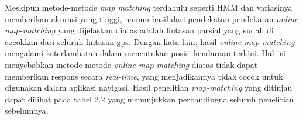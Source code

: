 Meskipun metode-metode \textit{map matching} terdahulu seperti HMM dan variasinya memberikan akurasi yang tinggi, namun hasil dari pendekatan-pendekatan \textit{online map-matching} yang dijelaskan diatas adalah lintasan parsial yang sudah di cocokkan dari seluruh lintasan gps. Dengan kata lain, hasil \textit{online map-matching} mengalami keterlambatan dalam menentukan posisi kendaraan terkini. Hal ini menyebabkan metode-metode \textit{ online map matching} diatas tidak dapat memberikan respons secara \textit{real-time}, yang menjadikannya tidak cocok untuk digunakan dalam aplikasi navigasi. Hasil penelitian \textit{map-matching} yang ditinjau dapat dilihat pada tabel 2.2 yang menunjukkan perbandingna seluruh penelitian sebelumnya.


